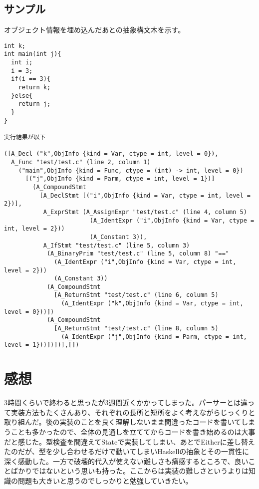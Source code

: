 \documentclass{jsarticle}
\begin{document}
\subsection{サンプル}
オブジェクト情報を埋め込んだあとの抽象構文木を示す。
\begin{verbatim}
int k;
int main(int j){
  int i;
  i = 3;
  if(i == 3){
    return k;
  }else{
    return j;
  }
}

実行結果が以下

([A_Decl ("k",ObjInfo {kind = Var, ctype = int, level = 0}),
  A_Func "test/test.c" (line 2, column 1)
    ("main",ObjInfo {kind = Func, ctype = (int) -> int, level = 0})
      [("j",ObjInfo {kind = Parm, ctype = int, level = 1})]
        (A_CompoundStmt
          [A_DeclStmt [("i",ObjInfo {kind = Var, ctype = int, level = 2})],
           A_ExprStmt (A_AssignExpr "test/test.c" (line 4, column 5)
                        (A_IdentExpr ("i",ObjInfo {kind = Var, ctype = int, level = 2}))
                        (A_Constant 3)),
           A_IfStmt "test/test.c" (line 5, column 3)
            (A_BinaryPrim "test/test.c" (line 5, column 8) "=="
              (A_IdentExpr ("i",ObjInfo {kind = Var, ctype = int, level = 2}))
              (A_Constant 3))
            (A_CompoundStmt
              [A_ReturnStmt "test/test.c" (line 6, column 5)
                (A_IdentExpr ("k",ObjInfo {kind = Var, ctype = int, level = 0}))])
            (A_CompoundStmt
              [A_ReturnStmt "test/test.c" (line 8, column 5)
                (A_IdentExpr ("j",ObjInfo {kind = Parm, ctype = int, level = 1}))])])],[])
\end{verbatim}

\section{感想}
3時間くらいで終わると思ったが3週間近くかかってしまった。パーサーとは違って実装方法もたくさんあり、それぞれの長所と短所をよく考えながらじっくりと取り組んだ。後の実装のことを良く理解しないまま間違ったコードを書いてしまうことも多かったので、全体の見通しを立ててからコードを書き始めるのは大事だと感じた。型検査を間違えてStateで実装してしまい、あとでEitherに差し替えたのだが、型を少し合わせるだけで動いてしまいHaskellの抽象とその一貫性に深く感動した。一方で破壊的代入が使えない難しさも痛感するところで、良いことばかりではないという思いも持った。ここからは実装の難しさというよりは知識の問題も大きいと思うのでしっかりと勉強していきたい。
\end{document}

